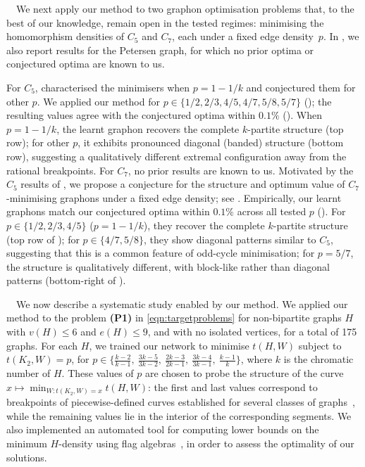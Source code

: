 \documentclass{article}
\theoremstyle{plain}
\theoremstyle{definition}
\theoremstyle{remark}
\begin{document}
\ $\,$
We next apply our method to two graphon optimisation problems that, to the best of our knowledge, remain open in the tested regimes: minimising the homomorphism densities of $C_5$ and $C_7$, each under a fixed edge density~$p$. In , we also report results for the Petersen graph, for which no prior optima or conjectured optima are known to us.

For $C_5$, \citet{bennett2020minimizing} characterised the minimisers when $p=1-1/k$ and conjectured them for other $p$. We applied our method for $p\in\{1/2, 2/3, 4/5, 4/7, 5/8, 5/7\}$ (); the resulting values agree with the conjectured optima within $0.1\%$ (). When $p=1-1/k$, the learnt graphon recovers the complete $k$-partite structure (top row); for other $p$, it exhibits pronounced diagonal (banded) structure (bottom row), suggesting a qualitatively different extremal configuration away from the rational breakpoints.
%
For $C_7$, no prior results are known to us. Motivated by the $C_5$ results of \citet{bennett2020minimizing}, we propose a conjecture for the structure and optimum value of $C_7$-minimising graphons under a fixed edge density; see . Empirically, our learnt graphons match our conjectured optima within $0.1\%$ across all tested $p$ (). For $p\in\{1/2,2/3,4/5\}$ ($p=1-1/k$), they recover the complete $k$-partite structure (top row of ); for $p\in\{4/7,5/8\}$, they show diagonal patterns similar to $C_5$, suggesting that this is a common feature of odd-cycle minimisation; for $p=5/7$, the structure is qualitatively different, with block-like rather than diagonal patterns (bottom-right of ).

\ $\,$
We now describe a systematic study enabled by our method.
We applied our method to the problem \textbf{(P1)} in \eqref{eqn:targetproblems} for non-bipartite graphs $H$ with $v(H) \le 6$ and $e(H) \le 9$, and with no isolated vertices, for a total of 175 graphs.
For each $H$, we trained our network to minimise $t(H,W)$ subject to $t(K_2,W)=p$, for
$p \in \{\frac{k-2}{k-1},\ \frac{3k-5}{3k-2},\ \frac{2k-3}{2k-1},\ \frac{3k-4}{3k-1},\ \frac{k-1}{k}\}$,
where $k$ is the chromatic number of $H$.
These values of $p$ are chosen to probe the structure of the curve
$x \mapsto \min_{W:t(K_2,W)=x} t(H,W)$:
the first and last values correspond to breakpoints of piecewise-defined curves established for several classes of graphs~\citep{razborov2008minimal,reiher2016clique,bennett2020minimizing}, while the remaining values lie in the interior of the corresponding segments.
We also implemented an automated tool for computing lower bounds on the minimum $H$-density using flag algebras~\citep{razborov2007flag}, in order to assess the optimality of our solutions.
\end{document}
